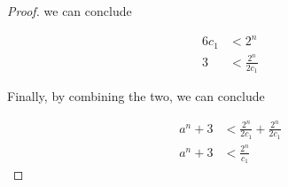 \documentclass[12pt]{article}
\begin{document}
\begin{itemize}
\begin{proof}
        we can conclude

        \begin{align}
            6c_1 &< 2^n\\
            3 &< \frac{2^n}{2c_1}
        \end{align}

        \bigskip

        Finally, by combining the two, we can conclude

        \begin{align}
            a^n + 3 &< \frac{2^n}{2c_1} + \frac{2^n}{2c_1}\\
            a^n + 3 &< \frac{2^n}{c_1}
        \end{align}
    \end{proof}

 \end{itemize}
\end{document}
